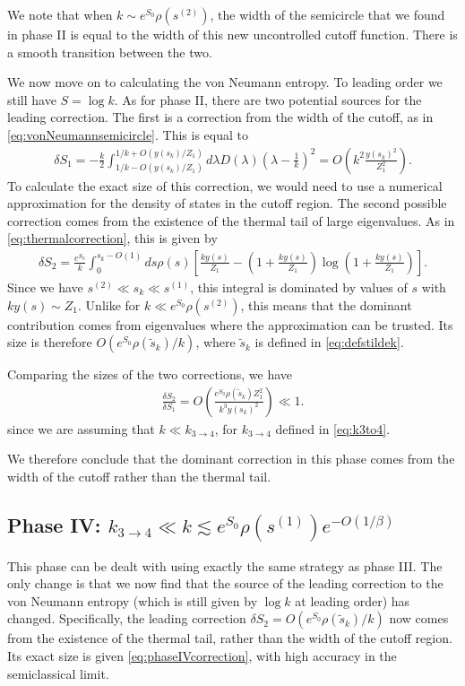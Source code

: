 \documentclass[11pt]{article}
\renewcommand{\tilde}{\widetilde}
\newcommand{\smax}{s_k}
\newcommand{\stilde}{\tilde{s}_k}
\numberwithin{equation}{section}
\begin{document}
We note that when $k \sim e^{S_0} \rho(s^{(2)})$, the width of the semicircle that we found in phase II is equal to the width of this new uncontrolled cutoff function. There is a smooth transition between the two.

We now move on to calculating the von Neumann entropy. To leading order we still have $S = \log k$. As for phase II, there are two potential sources for the leading correction. The first is a correction from the width of the cutoff, as in \eqref{eq:vonNeumannsemicircle}. This is equal to
\begin{align}  \label{eq:phase3cutoffcorrection}
\delta S_1 = - \frac{k}{2}\int_{1/k - O(y(\smax)/Z_1)}^{1/k + O(y(\smax)/Z_1)}  d \lambda D(\lambda) (\lambda - \frac{1}{k})^2 = O(k^2 \frac{y(\smax)^2}{Z_1^2}).
\end{align}
To calculate the exact size of this correction, we would need to use a numerical approximation for the density of states in the cutoff region. The second possible correction comes from the existence of the thermal tail of large eigenvalues. As in \eqref{eq:thermalcorrection}, this is given by
\begin{align} \label{eq:phaseIVcorrection}
\delta S_2 = \frac{e^{S_0}}{k} \int_0^{\smax - O(1)} ds \rho(s) \left[\frac{ky(s)}{Z_1} - \left(1 +\frac{k y(s)}{Z_1}\right) \log \left(1 + \frac{k y(s)}{Z_1}\right)\right].
\end{align}
Since we have $s^{(2)} \ll \smax \ll s^{(1)}$, this integral is dominated by values of $s$ with $k y(s)\sim Z_1$. Unlike for $k \ll e^{S_0} \rho(s^{(2)})$, this means that the dominant contribution comes from eigenvalues where the approximation can be trusted. Its size is therefore $O(e^{S_0} \rho(\stilde)/k)$, where $\stilde$ is defined in \eqref{eq:defstildek}.

Comparing the sizes of the two corrections, we have
\begin{align}
\frac{\delta S_2}{\delta S_1} = O\left(\frac{e^{S_0} \rho(\stilde) Z_1^2}{k^3 y(\smax)^2}\right) \ll 1.
\end{align}
since we are assuming that $k \ll k_{3 \to 4}$, for $k_{3 \to 4}$ defined in \eqref{eq:k3to4}.

We therefore conclude that the dominant correction in this phase comes from the width of the cutoff rather than the thermal tail.

\subsection*{Phase IV: $k_{3 \to 4} \ll k \lesssim e^{S_0} \rho( s^{(1)})e^{-O(1/\beta)}$ }
This phase can be dealt with using exactly the same strategy as phase III. The only change is that we now find that the source of the leading correction to the von Neumann entropy (which is still given by $\log k$ at leading order) has changed. Specifically, the leading correction $\delta S_2 = O(e^{S_0} \rho(\stilde)/k)$ now comes from the existence of the thermal tail, rather than the width of the cutoff region. Its exact size is given \eqref{eq:phaseIVcorrection}, with high accuracy in the semiclassical limit.
\end{document}
